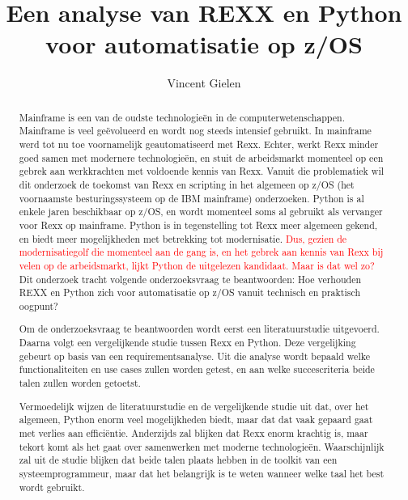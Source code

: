 \documentclass{hogent-article}
\title{Een analyse van REXX en Python voor automatisatie op z/OS}
\author{Vincent Gielen}
\begin{document}
    
    \setlength{\emergencystretch}{1em}

\begin{abstract}
  Mainframe is een van de oudste technologieën in de computerwetenschappen. Mainframe is veel geëvolueerd en wordt nog steeds intensief gebruikt. In mainframe werd tot nu toe voornamelijk geautomatiseerd met Rexx. Echter, werkt Rexx minder goed samen met modernere technologieën, en stuit de arbeidsmarkt momenteel op een gebrek aan werkkrachten met voldoende kennis van Rexx. Vanuit die problematiek wil dit onderzoek de toekomst van Rexx en scripting in het algemeen op z/OS (het voornaamste besturingssysteem op de IBM mainframe) onderzoeken. Python is al enkele jaren beschikbaar op z/OS, en wordt momenteel soms al gebruikt als vervanger voor Rexx op mainframe. Python is in tegenstelling tot Rexx meer algemeen gekend, en biedt meer mogelijkheden met betrekking tot modernisatie. \textcolor{red} {Dus, gezien de modernisatiegolf die momenteel aan de gang is, en het gebrek aan kennis van Rexx bij velen op de arbeidsmarkt, lijkt Python de uitgelezen kandidaat. Maar is dat wel zo?} Dit onderzoek tracht volgende onderzoeksvraag te beantwoorden: Hoe verhouden REXX en Python zich voor automatisatie op z/OS vanuit technisch en praktisch oogpunt?
  
  \qquad Om de onderzoeksvraag te beantwoorden wordt eerst een literatuurstudie uitgevoerd. Daarna volgt een vergelijkende studie tussen Rexx en Python. Deze vergelijking gebeurt op basis van een requirementsanalyse. Uit die analyse wordt bepaald welke functionaliteiten en use cases zullen worden getest, en aan welke succescriteria beide talen zullen worden getoetst.
  
  \qquad Vermoedelijk wijzen de literatuurstudie en de vergelijkende studie uit dat, over het algemeen, Python enorm veel mogelijkheden biedt, maar dat dat vaak gepaard gaat met verlies aan efficiëntie. Anderzijds zal blijken dat Rexx enorm krachtig is, maar tekort komt als het gaat over samenwerken met moderne technologieën. Waarschijnlijk zal uit de studie blijken dat beide talen plaats hebben in de toolkit van een systeemprogrammeur, maar dat het belangrijk is te weten wanneer welke taal het best wordt gebruikt.
  
\end{abstract}

\tableofcontents



\printbibliography[heading=bibintoc]
\end{document}
